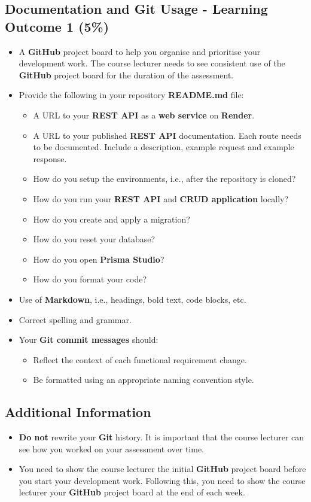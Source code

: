 \documentclass{article}
\begin{document}
\subsection*{Documentation and Git Usage - Learning Outcome 1 (5\%)}
\begin{itemize}
	\item A \textbf{GitHub} project board to help you organise and prioritise your development work. The course lecturer needs to see consistent use of the \textbf{GitHub} project board for the duration of the assessment.
    \item Provide the following in your repository \textbf{README.md} file:
    \begin{itemize} 
	\item A URL to your \textbf{REST API} as a \textbf{web service} on \textbf{Render}.
	\item A URL to your published \textbf{REST API} documentation. Each route needs to be documented. Include a description, example request and example response.
      \item How do you setup the environments, i.e., after the repository is cloned?
	  \item How do you run your \textbf{REST API} and \textbf{CRUD application} locally?
	  \item How do you create and apply a migration?  
	  \item How do you reset your database?
	  \item How do you open \textbf{Prisma Studio}?
	  \item How do you format your code?
    \end{itemize}
    \item Use of \textbf{Markdown}, i.e., headings, bold text, code blocks, etc.
    \item Correct spelling and grammar.
    \item Your \textbf{Git commit messages} should:
    \begin{itemize}
      \item Reflect the context of each functional requirement change.
      \item Be formatted using an appropriate naming convention style.
    \end{itemize}	
\end{itemize} 

\subsection*{Additional Information}
\begin{itemize}
    \item \textbf{Do not} rewrite your \textbf{Git} history. It is important that the course lecturer can see how you worked on your assessment over time. 
    \item You need to show the course lecturer the initial \textbf{GitHub} project board before you start your development work. Following this, you need to show the course lecturer your \textbf{GitHub} project board at the end of each week.
\end{itemize} 
\end{document}

